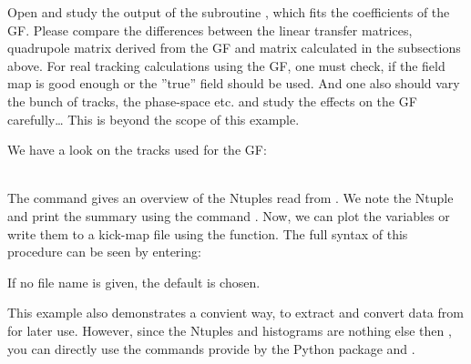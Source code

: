 Open \wo  and study the output of the
subroutine , which fits the coefficients of the GF.
Please compare the differences between the linear transfer matrices,
quadrupole matrix derived from the GF and matrix calculated in the
subsections above. For real tracking calculations using the GF, one
must check, if the field map is good enough or the ''true'' field
should be used.  And one also should
vary the bunch of tracks, the phase-space etc. and study the
effects on the GF carefully{\ldots} This is beyond the scope of this
example.

We have a look on the tracks used for the GF:

\\

The command  gives an overview of the Ntuples read from
.
We note the Ntuple  and print the summary
using the command . Now, we can plot the variables or write
them to a kick-map file using the  function. The full syntax of
this procedure can be seen by entering:


If no file name is given, the default  is chosen.

This example also demonstrates a convient way, to extract and convert
data from  for later use. However, since the Ntuples
and histograms are nothing else then , you
can directly use the commands provide by the Python package
 and .

